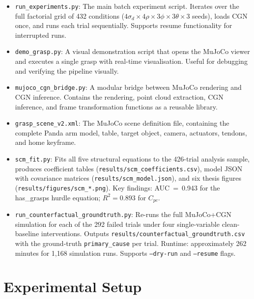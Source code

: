 \documentclass[11pt,a4paper]{report}
\begin{document}
\begin{itemize}
  \item \texttt{run\_experiments.py}: The main batch experiment script. Iterates over the full factorial grid of 432 conditions ($4 \sigma_d \times 4 \rho \times 3 \phi \times 3 \theta \times 3$ seeds), loads CGN once, and runs each trial sequentially. Supports resume functionality for interrupted runs.

  \item \texttt{demo\_grasp.py}: A visual demonstration script that opens the MuJoCo viewer and executes a single grasp with real-time visualisation. Useful for debugging and verifying the pipeline visually.

  \item \texttt{mujoco\_cgn\_bridge.py}: A modular bridge between MuJoCo rendering and CGN inference. Contains the rendering, point cloud extraction, CGN inference, and frame transformation functions as a reusable library.

  \item \texttt{grasp\_scene\_v2.xml}: The MuJoCo scene definition file, containing the complete Panda arm model, table, target object, camera, actuators, tendons, and home keyframe.

  \item \texttt{scm\_fit.py}: Fits all five structural equations to the 426-trial analysis sample, produces coefficient tables (\texttt{results/scm\_coefficients.csv}), model JSON with covariance matrices (\texttt{results/scm\_model.json}), and six thesis figures (\texttt{results/figures/scm\_*.png}). Key findings: AUC~=~0.943 for the has\_grasps hurdle equation; $R^2 = 0.893$ for $C_{pc}$.

  \item \texttt{run\_counterfactual\_groundtruth.py}: Re-runs the full MuJoCo+CGN simulation for each of the 292 failed trials under four single-variable clean-baseline interventions. Outputs \texttt{results/counterfactual\_groundtruth.csv} with the ground-truth \texttt{primary\_cause} per trial. Runtime: approximately 262 minutes for 1,168 simulation runs. Supports \texttt{--dry-run} and \texttt{--resume} flags.
\end{itemize}


\chapter{Experimental Setup}
\label{ch:experiments}
\end{document}
